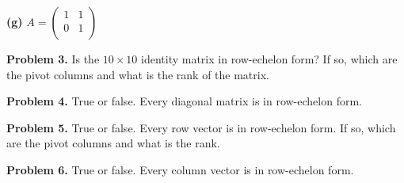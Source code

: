 \documentclass[oneside,12pt]{amsart}
\begin{document}
\bigskip
\bigskip
\bigskip
\bigskip
\bigskip
\bigskip

\textbf{(g)}
$
A =
\begin{pmatrix}
1 & 1 \\
0 & 1 \\
\end{pmatrix}
$

\bigskip
\bigskip
\bigskip
\bigskip
\bigskip
\bigskip

\textbf{Problem 3.} Is the $10\times 10$ identity matrix in row-echelon form?
If so, which are the pivot columns and what is the rank of the matrix.

\bigskip
\bigskip
\bigskip
\bigskip
\bigskip
\bigskip

\textbf{Problem 4.} True or false. Every diagonal matrix is in row-echelon form.

\bigskip
\bigskip
\bigskip
\bigskip
\bigskip
\bigskip

\textbf{Problem 5.} True or false. Every row vector is in row-echelon form.
If so, which are the pivot columns and what is the rank.

\bigskip
\bigskip
\bigskip
\bigskip
\bigskip
\bigskip

\textbf{Problem 6.} True or false. Every column vector is in row-echelon form.
\end{document}
